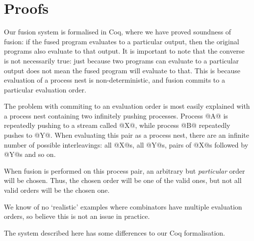 
\section{Proofs}
\label{s:Proofs}

Our fusion system is formalised in Coq, where we have proved soundness of fusion: if the fused program evaluates to a particular output, then the original programs also evaluate to that output.
It is important to note that the converse is not necessarily true: just because two programs can evaluate to a particular output does not mean the fused program will evaluate to that.
This is because evaluation of a process nest is non-deterministic, and fusion commits to a particular evaluation order.

The problem with commiting to an evaluation order is most easily explained with a process nest containing two infinitely pushing processes.
Process @A@ is repeatedly pushing to a stream called @X@, while process @B@ repeatedly pushes to @Y@.
When evaluating this pair as a process nest, there are an infinite number of possible interleavings: all @X@s, all @Y@s, pairs of @X@s followed by @Y@s and so on.

When fusion is performed on this process pair, an arbitrary but \emph{particular} order will be chosen.
Thus, the chosen order will be one of the valid ones, but not all valid orders will be the chosen one.

We know of no `realistic' examples where combinators have multiple evaluation orders, so believe this is not an issue in practice.

The system described here has some differences to our Coq formalisation.

